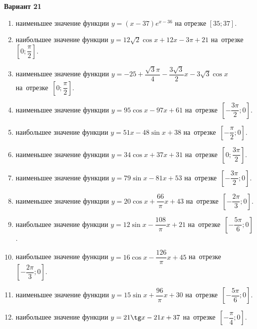 \documentclass[a4paper,10pt]{article}
\begin{document}
\begin{center}\Large\textbf{Вариант 21}\end{center}

\begin{enumerate}
\item {} наименьшее значение функции $y = \left(x-37\right)e^{x-36}$ на отрезке $\left[35;37\right]$.

\item {} наибольшее значение функции $y = 12\sqrt{2}\cos x+12x-3\pi +21$ на~отрезке~$\left[0;\dfrac{\pi }{2}\right]$.

\item {} наименьшее значение функции $y = -25+\dfrac{\sqrt{3} \pi}{4}-\dfrac{3\sqrt{3}}{2}x-3\sqrt{3}\cos x$ на~отрезке~$\left[0;\dfrac{\pi }{2}\right]$.

\item {} наименьшее значение функции $y = 95\cos x-97x+61$ на~отрезке~$\left[-\dfrac{3\pi }{2};0\right]$.

\item {} наибольшее значение функции $y = 51x-48\sin x+38$ на~отрезке~$\left[-\dfrac{\pi }{2};0\right]$.

\item {} наименьшее значение функции $y = 34\cos x+37x+31$ на~отрезке~$\left[0;\dfrac{3\pi }{2}\right]$.

\item {} наименьшее значение функции $y = 79\sin x-81x+53$ на~отрезке~$\left[-\dfrac{3\pi }{2};0\right]$.

\item {} наименьшее значение функции $y = 20\cos x+\dfrac{66}{\pi }x +43$ на~отрезке~$\left[-\dfrac{2\pi }{3};0\right]$.

\item {} наибольшее значение функции $y = 12\sin x-\dfrac{108}{\pi }x+21$ на~отрезке~$\left[-\dfrac{5\pi }{6};0\right]$.

\item {} наибольшее значение функции $y = 16\cos x-\dfrac{126}{\pi }x+45$ на~отрезке~$\left[-\dfrac{2\pi }{3};0\right]$.

\item {} наименьшее значение функции $y = 15\sin x+\dfrac{96}{\pi }x+30$ на~отрезке~$\left[-\dfrac{5\pi }{6};0\right]$.

\item {} наибольшее значение функции $y = 21\tg x-21x+37$ на~отрезке~$\left[-\dfrac{\pi }{4};0\right]$.


\end{enumerate}
\end{document}
